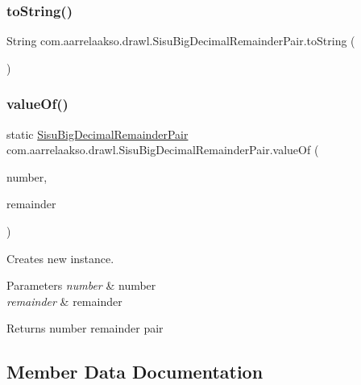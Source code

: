 \subsubsection{\texorpdfstring{to\+String()}{toString()}}
{\footnotesize\ttfamily String com.\+aarrelaakso.\+drawl.\+Sisu\+Big\+Decimal\+Remainder\+Pair.\+to\+String (\begin{DoxyParamCaption}{ }\end{DoxyParamCaption})}

\mbox{\label{classcom_1_1aarrelaakso_1_1drawl_1_1_sisu_big_decimal_remainder_pair_ad23fce014bb13131e936ebbbbc33c9b2}} 
\subsubsection{\texorpdfstring{value\+Of()}{valueOf()}}
{\footnotesize\ttfamily static \hyperlink{classcom_1_1aarrelaakso_1_1drawl_1_1_sisu_big_decimal_remainder_pair}{Sisu\+Big\+Decimal\+Remainder\+Pair} com.\+aarrelaakso.\+drawl.\+Sisu\+Big\+Decimal\+Remainder\+Pair.\+value\+Of (\begin{DoxyParamCaption}\item[{\hyperlink{classcom_1_1aarrelaakso_1_1drawl_1_1_sisu_big_decimal}{Sisu\+Big\+Decimal}}]{number,  }\item[{\hyperlink{classcom_1_1aarrelaakso_1_1drawl_1_1_sisu_big_decimal}{Sisu\+Big\+Decimal}}]{remainder }\end{DoxyParamCaption})\hspace{0.3cm}{\ttfamily [static]}}

Creates new instance.


\begin{DoxyParams}{Parameters}
{\em number} & number \\
\hline
{\em remainder} & remainder \\
\hline
\end{DoxyParams}
\begin{DoxyReturn}{Returns}
number remainder pair 
\end{DoxyReturn}


\subsection{Member Data Documentation}
\mbox{\label{classcom_1_1aarrelaakso_1_1drawl_1_1_sisu_big_decimal_remainder_pair_aa9a5427a9e385635c8926422a430dcdd}} 
